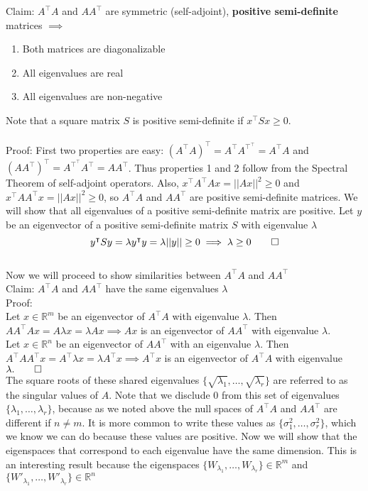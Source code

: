 \documentclass[11pt]{article}
\begin{document}
Claim: $A^\intercal A$ and $AA^\intercal$ are symmetric (self-adjoint), {\bf positive semi-definite} matrices $\implies$
\begin{enumerate}
\item Both matrices are diagonalizable
\item All eigenvalues are real
\item All eigenvalues are non-negative
\end{enumerate}
Note that a square matrix $S$ is positive semi-definite if $x^\intercal Sx \geq 0$.\\\\
Proof: First two properties are easy: $(A^\intercal A)^\intercal = A^\intercal A^{\intercal^\intercal} = A^\intercal A$ and $(AA^\intercal)^\intercal = A^{\intercal^\intercal}A^\intercal = AA^\intercal$. Thus properties 1 and 2 follow from the Spectral Theorem of self-adjoint operators. Also, $x^\intercal A^\intercal Ax = \vert\vert Ax \vert\vert^2 \geq 0$ and $x^\intercal AA^\intercal x = \vert\vert Ax \vert\vert^2 \geq 0$, so $A^\intercal A$ and $AA^\intercal$ are positive semi-definite matrices. We will show that all eigenvalues of a positive semi-definite matrix are positive. Let $y$ be an eigenvector of a positive semi-definite matrix $S$ with eigenvalue $\lambda$
\begin{equation*}
y^\intercal Sy = \lambda y^\intercal y = \lambda \vert\vert y \vert\vert \geq 0 \implies \lambda \geq 0 \qed
\end{equation*}\\

Now we will proceed to show similarities between $A^\intercal A$ and $AA^\intercal$ \\

Claim: $A^\intercal A$ and $AA^\intercal$ have the same eigenvalues $\lambda$\\
Proof:\\
Let $x \in \mathbb{R}^m$ be an eigenvector of $A^\intercal A$ with eigenvalue $\lambda$. Then $AA^\intercal Ax = A\lambda x = \lambda Ax \implies Ax$ is an eigenvector of $AA^\intercal$ with eigenvalue $\lambda$.\\
Let $x \in \mathbb{R}^n$ be an eigenvector of $AA^\intercal$ with an eigenvalue $\lambda$. Then $A^\intercal AA^\intercal x = A^\intercal \lambda x = \lambda A^\intercal x \implies A^\intercal x$ is an eigenvector of $A^\intercal A$ with eigenvalue $\lambda. \qed$\\

The square roots of these shared eigenvalues $\{\sqrt{\lambda_1},\dots,\sqrt{\lambda_r}\}$ are referred to as the singular values of $A$. Note that we disclude 0 from this set of eigenvalues $\{\lambda_1,\dots,\lambda_r\}$, because as we noted above the null spaces of $A^\intercal A$ and $AA^\intercal$ are different if $n \neq m$. It is more common to write these values as $\{\sigma_1^2,\dots,\sigma_r^2\}$, which we know we can do because these values are positive. Now we will show that the eigenspaces that correspond to each eigenvalue have the same dimension. This is an interesting result because the eigenspaces $\{W_{\lambda_1},\dots,W_{\lambda_r}\} \in \mathbb{R}^m$ and $\{W'_{\lambda_1},\dots,W'_{\lambda_r}\} \in \mathbb{R}^n$ \\
\end{document}
